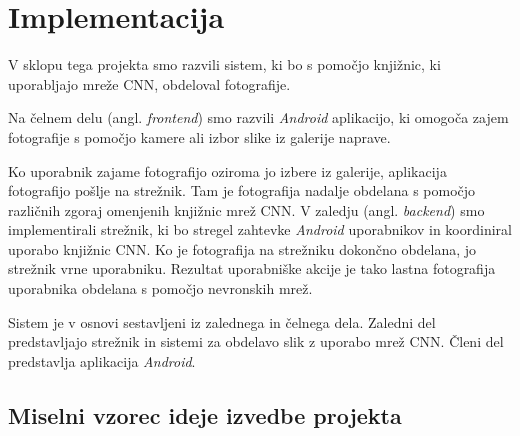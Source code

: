 \documentclass[runningheads,a4paper]{llncs}
\begin{document}


\section{Implementacija}
V sklopu tega projekta smo razvili sistem, ki bo s pomočjo knjižnic, ki uporabljajo mreže CNN, obdeloval fotografije. 

Na čelnem delu (angl. \textit{frontend}) smo razvili \textit{Android} aplikacijo, ki omogoča zajem fotografije s pomočjo kamere ali izbor slike iz galerije naprave. 


Ko uporabnik zajame fotografijo oziroma jo izbere iz galerije, aplikacija fotografijo pošlje na strežnik. Tam je fotografija nadalje obdelana s pomočjo različnih zgoraj omenjenih knjižnic mrež CNN. V zaledju (angl. \textit{backend}) smo implementirali strežnik, ki bo stregel zahtevke \textit{Android} uporabnikov in koordiniral uporabo knjižnic CNN. Ko je fotografija na strežniku dokončno obdelana, jo strežnik vrne uporabniku. Rezultat uporabniške akcije je tako lastna fotografija uporabnika obdelana s pomočjo nevronskih mrež.

Sistem je v osnovi sestavljeni iz zalednega in čelnega dela. Zaledni del predstavljajo strežnik in sistemi za obdelavo slik z uporabo mrež CNN. Členi del predstavlja aplikacija \textit{Android}.

\subsection{Miselni vzorec ideje izvedbe projekta}
\end{document}
